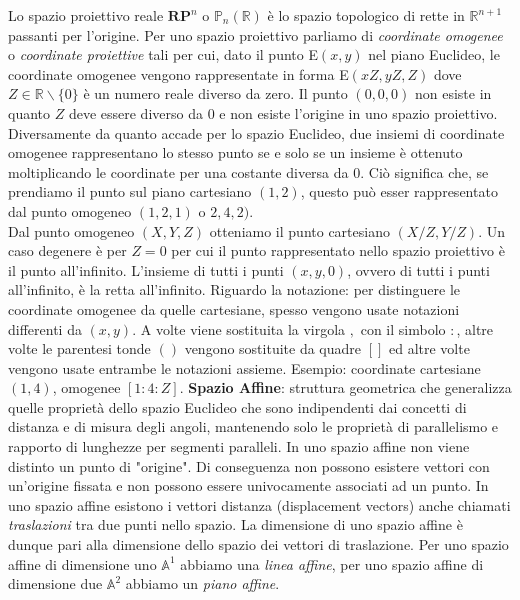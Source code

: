 \documentclass[a4paper,12pt]{tesiinfo}
\begin{document}
\newline
Lo spazio proiettivo reale $\textbf{RP}^n$ o $\mathbb{P}_n(\mathbb{R})$ \`e lo spazio topologico di rette in $\mathbb{R}^ {n+1}$ passanti per l'origine.
\newline
Per uno spazio proiettivo parliamo di \textit{coordinate omogenee} o \textit{coordinate proiettive} tali per cui, dato il punto E$(x, y)$ nel piano Euclideo, le coordinate omogenee vengono rappresentate in forma E$(xZ, yZ, Z)$ dove $Z \in \mathbb{R} \backslash \{0\}$ \`e un numero reale diverso da zero. Il punto $(0, 0, 0)$ non esiste in quanto $Z$ deve essere diverso da $0$ e non esiste l'origine in uno spazio proiettivo. Diversamente da quanto accade per lo spazio Euclideo, due insiemi di coordinate omogenee rappresentano lo stesso punto se e solo se un insieme \`e ottenuto moltiplicando le coordinate per una costante diversa da 0. Ci\`o significa che, se prendiamo il punto sul piano cartesiano $(1, 2)$, questo pu\`o esser rappresentato dal punto omogeneo $(1, 2, 1)$ o $2, 4, 2)$.\\
Dal punto omogeneo $(X, Y, Z)$ otteniamo il punto cartesiano $(X/Z, Y/Z)$. Un caso degenere \`e per $Z=0$ per cui il punto rappresentato nello spazio proiettivo \`e il punto all'infinito. L'insieme di tutti i punti $(x, y, 0)$, ovvero di tutti i punti all'infinito, \`e la retta all'infinito.
\newline
Riguardo la notazione: per distinguere le coordinate omogenee da quelle cartesiane, spesso vengono usate notazioni differenti da $(x, y)$. A volte viene sostituita la virgola $,$ con il simbolo $:$, altre volte le parentesi tonde $()$ vengono sostituite da quadre $[]$ ed altre volte vengono usate entrambe le notazioni assieme. Esempio: coordinate cartesiane $(1, 4)$, omogenee $[1:4:Z]$.
\newline\newline
%
%
%
\textbf{Spazio Affine}: struttura geometrica che generalizza quelle propriet\`a dello spazio Euclideo che sono indipendenti dai concetti di distanza e di misura degli angoli, mantenendo solo le propriet\`a di parallelismo e rapporto di lunghezze per segmenti paralleli. In uno spazio affine non viene distinto un punto di "origine". Di conseguenza non possono esistere vettori con un'origine fissata e non possono essere univocamente associati ad un punto. In uno spazio affine esistono i vettori distanza (displacement vectors) anche chiamati \textit{traslazioni} tra due punti nello spazio. La dimensione di uno spazio affine \`e dunque pari alla dimensione dello spazio dei vettori di traslazione. Per uno spazio affine di dimensione uno $\mathbb{A}^1$ abbiamo una \textit{linea affine}, per uno spazio affine di dimensione due $\mathbb{A}^2$ abbiamo un \textit{piano affine}.
\end{document}
